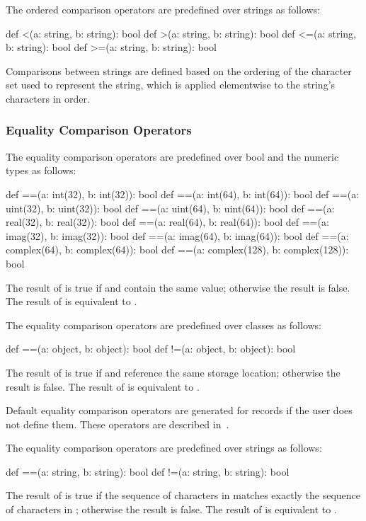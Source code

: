 The ordered comparison operators are predefined over strings as follows:
\begin{chapel}
def <(a: string, b: string): bool
def >(a: string, b: string): bool
def <=(a: string, b: string): bool
def >=(a: string, b: string): bool
\end{chapel}
Comparisons between strings are defined based on the ordering of the
character set used to represent the string, which is applied
elementwise to the string's characters in order.


\subsubsection{Equality Comparison Operators}
\label{Equality_Comparison_Operators}

The equality comparison operators are predefined over bool and the
numeric types as follows:
\begin{chapel}
def ==(a: int(32), b: int(32)): bool
def ==(a: int(64), b: int(64)): bool
def ==(a: uint(32), b: uint(32)): bool
def ==(a: uint(64), b: uint(64)): bool
def ==(a: real(32), b: real(32)): bool
def ==(a: real(64), b: real(64)): bool
def ==(a: imag(32), b: imag(32)): bool
def ==(a: imag(64), b: imag(64)): bool
def ==(a: complex(64), b: complex(64)): bool
def ==(a: complex(128), b: complex(128)): bool
\end{chapel}
The result of  is true if  and  contain
the same value; otherwise the result is false.  The result of  is equivalent to .

The equality comparison operators are predefined over classes as
follows:
\begin{chapel}
def ==(a: object, b: object): bool
def !=(a: object, b: object): bool
\end{chapel}
The result of  is true if  and  reference
the same storage location; otherwise the result is false.  The result
of  is equivalent to .

Default equality comparison operators are generated for records if the
user does not define them.  These operators are described
in~.

The equality comparison operators are predefined over strings as
follows:
\begin{chapel}
def ==(a: string, b: string): bool
def !=(a: string, b: string): bool
\end{chapel}
The result of  is true if the sequence of characters
in  matches exactly the sequence of characters in ;
otherwise the result is false.  The result of  is
equivalent to .

